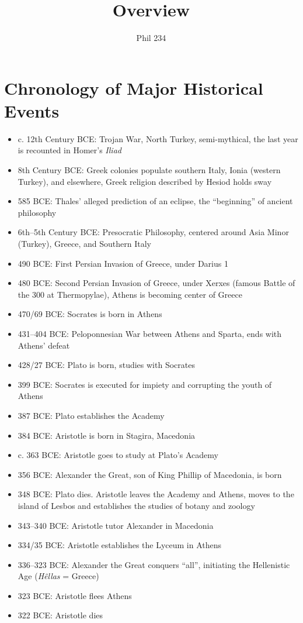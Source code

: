 \documentclass[11pt]{article}
\begin{document}
\author{Phil 234}
\title{Overview}
\maketitle
\section*{Chronology of Major Historical Events}
\begin{itemize}
\item{c. 12th Century BCE: Trojan War, North Turkey,  semi-mythical, the last year is recounted in Homer's \emph{Iliad}}
\item{8th Century BCE: Greek colonies populate southern Italy, Ionia (western Turkey), and elsewhere, Greek religion described by Hesiod holds sway}
\item 585 BCE: Thales' alleged prediction of an eclipse, the ``beginning'' of ancient philosophy
\item{6th--5th Century BCE: Presocratic Philosophy, centered around Asia Minor (Turkey), Greece, and Southern Italy}
\item{490 BCE: First Persian Invasion of Greece, under Darius 1}
\item{480 BCE: Second Persian Invasion of Greece, under Xerxes (famous Battle of the 300 at Thermopylae), Athens is becoming center of Greece}
\item{470/69 BCE: Socrates is born in Athens}
\item{431--404 BCE: Peloponnesian War between Athens and Sparta, ends with Athens' defeat}
\item{428/27 BCE: Plato is born, studies with Socrates}
\item{399 BCE: Socrates is executed for impiety and corrupting the youth of Athens}
\item{387 BCE: Plato establishes the Academy}

\item{384 BCE: Aristotle is born in Stagira, Macedonia}
\item{c. 363 BCE: Aristotle goes to study at Plato's Academy}
\item{356 BCE: Alexander the Great, son of King Phillip of Macedonia, is born}
\item{348 BCE: Plato dies. Aristotle leaves the Academy and Athens, moves to the island of Lesbos and establishes the studies of botany and zoology}
\item{343--340 BCE: Aristotle tutor Alexander in Macedonia}
\item{334/35 BCE: Aristotle establishes the Lyceum in Athens}
\item{336--323 BCE: Alexander the Great conquers ``all'', initiating the Hellenistic Age (\emph{H\^{e}llas} = Greece)}
\item{323 BCE: Aristotle flees Athens }
\item{322 BCE: Aristotle dies}


\end{itemize}
\end{document}
